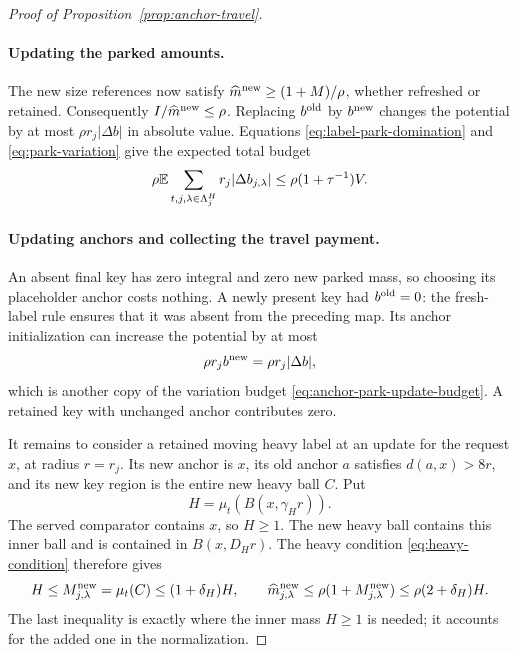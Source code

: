 \begin{proof}[Proof of Proposition~\ref{prop:anchor-travel}]
\paragraph{Updating the parked amounts.}
The new size references now satisfy
$\widehat m^{\rm new}\ge(1+M)/\rho$, whether refreshed or retained.
Consequently $I/\widehat m^{\rm new}\le\rho$.  Replacing $b^{\rm old}$
by $b^{\rm new}$ changes the potential by at most
$\rho r_j|\Delta b|$ in absolute value.  Equations
\eqref{eq:label-park-domination} and \eqref{eq:park-variation} give
the expected total budget
\begin{equation}\label{eq:anchor-park-update-budget}
 \rho\mathbb E\sum_{t,j,\lambda\in\Lambda_j^H}r_j|\Delta b_{j,\lambda}|
                      \le\rho(1+\tau^{-1})V.
\end{equation}

\paragraph{Updating anchors and collecting the travel payment.}
An absent final key has zero integral and zero new parked mass, so
choosing its placeholder anchor costs nothing.  A newly present key
had $b^{\rm old}=0$: the fresh-label rule ensures that it was absent
from the preceding map.  Its anchor initialization can increase the
potential by at most
\[
 \rho r_j b^{\rm new}=\rho r_j|\Delta b|,
\]
which is another copy of the variation budget
\eqref{eq:anchor-park-update-budget}.  A retained key with unchanged
anchor contributes zero.

It remains to consider a retained moving heavy label at an update for
the request $x$, at radius $r=r_j$.  Its new anchor is $x$, its old
anchor $a$ satisfies $d(a,x)>8r$, and its new key region is the entire
new heavy ball $C$.  Put
\[
 H=\mu_t(B(x,\gamma_H r)).
\]
The served comparator contains $x$, so $H\ge1$.  The new heavy ball
contains this inner ball and is contained in $B(x,D_Hr)$.  The heavy
condition \eqref{eq:heavy-condition} therefore gives
\begin{equation}\label{eq:anchor-heavy-mass-comparison}
 H\le M^{\rm new}_{j,\lambda}=\mu_t(C)\le(1+\delta_H)H,
 \qquad
 \widehat m^{\rm new}_{j,\lambda}
       \le\rho(1+M^{\rm new}_{j,\lambda})
       \le\rho(2+\delta_H)H.
\end{equation}
The last inequality is exactly where the inner mass $H\ge1$ is needed;
it accounts for the added one in the normalization.


\end{proof}
